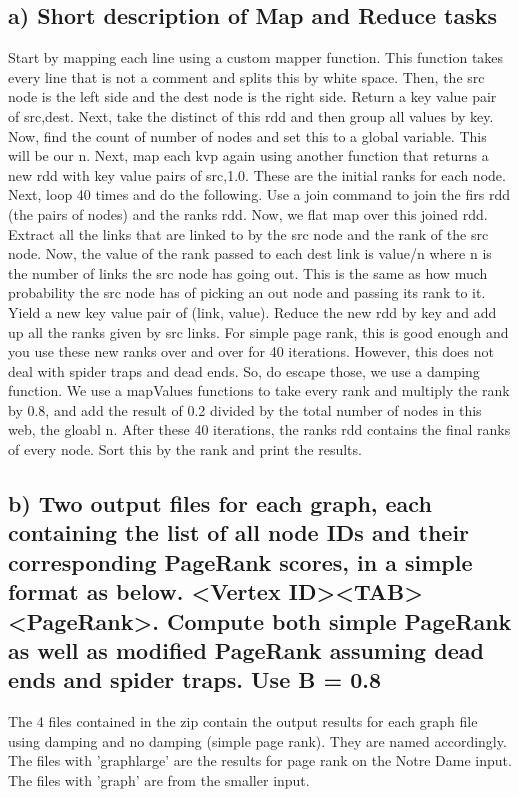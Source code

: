 \subsection*{a) Short description of Map and Reduce tasks}
Start by mapping each line using a custom mapper function. This function takes every line that is not a comment and splits this by white space. Then, the src node is the left side and the dest node is the right side. Return a key value pair of src,dest. Next, take the distinct of this rdd and then group all values by key. Now, find the count of number of nodes and set this to a global variable. This will be our n. Next, map each kvp again using another function that returns a new rdd with key value pairs of src,1.0. These are the initial ranks for each node. Next, loop 40 times and do the following. Use a join command to join the firs rdd (the pairs of nodes) and the ranks rdd. Now, we flat map over this joined rdd. Extract all the links that are linked to by the src node and the rank of the src node. Now, the value of the rank passed to each dest link is value/n where n is the number of links the src node has going out. This is the same as how much probability the src node has of picking an out node and passing its rank to it. Yield a new key value pair of (link, value). Reduce the new rdd by key and add up all the ranks given by src links. For simple page rank, this is good enough and you use these new ranks over and over for 40 iterations. However, this does not deal with spider traps and dead ends. So, do escape those, we use a damping function. We use a mapValues functions to take every rank and multiply the rank by 0.8, and add the result of 0.2 divided by the total number of nodes in this web, the gloabl n. After these 40 iterations, the ranks rdd contains the final ranks of every node. Sort this by the rank and print the results. 
\subsection*{b) Two output files for each graph, each containing the list of all node IDs and their corresponding PageRank scores, in a simple format as below. <Vertex ID><TAB><PageRank>. Compute both simple PageRank as well as modified PageRank assuming dead ends and spider traps. Use B = 0.8}
The 4 files contained in the zip contain the output results for each graph file using damping and no damping (simple page rank). They are named accordingly. The files with 'graphlarge' are the results for page rank on the Notre Dame input. The files with 'graph' are from the smaller input. 

